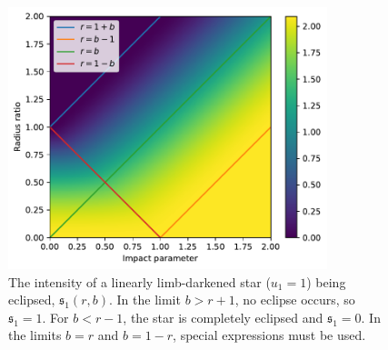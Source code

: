 \documentclass[modern,trackchanges]{aastex63}
\begin{document}
\begin{figure}[p!]
    \begin{centering}
    \includegraphics[height=3in]{figures/julia/transit_linear.pdf}
    \caption{The intensity of a linearly limb-darkened star ($u_1=1$) being
    eclipsed, $\mathfrak{s}_1(r,b)$.
    In the limit $b > r+1$, no eclipse occurs, so $\mathfrak{s}_1=1$.  For $b < r-1$, the star
    is completely eclipsed and $\mathfrak{s}_1=0$.  In the limits $b=r$ and $b=1-r$, special
    expressions must be used.
    \label{transit_linear}}
    \end{centering}
\end{figure}
\end{document}

